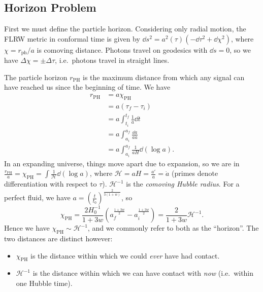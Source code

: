 \documentclass{jknotes}
\begin{document}
\subsection{Horizon Problem}
First we must define the particle horizon. Considering only radial motion, the FLRW metric in conformal time is given by \(\dd{s}^2 = a^2(\tau)(-\dd{\tau}^2+\dd{\chi}^2)\), where \(\chi = r_{\text{ph}}/a\) is comoving distance. Photons travel on geodesics with \(\dd{s}=0\), so we have \(\Delta\chi = \pm \Delta\tau\), i.e.\ photons travel in straight lines.
\begin{figure}[H]
    \centering
\end{figure}
The particle horizon \(r_{\text{PH}}\) is the maximum distance from which any signal can have reached us since the beginning of time. We have
\begin{align}
    r_{\text{PH}} &= a\chi_{\text{PH}} \\
                  &= a(\tau_f-\tau_i) \\
                  &= a\int^{t_f}_{t_i}\frac{1}{a}\dd{t} \\
                  &= a\int^{a_f}_{a_i}\frac{\dd{a}}{a\dot{a}} \\
                  &= a\int^{a_f}_{a_i}\frac{1}{aH}\dd{(\log a)}.
\end{align}
In an expanding universe, things move apart due to expansion, so we are in \(\frac{r_{\text{PH}}}{a} = \chi_{\text{PH}} = \int\frac{1}{\mathcal{H}}\dd{(\log a)}\), where \(\mathcal{H}=aH = \frac{a'}{a}=\dot{a}\) (primes denote differentiation with respect to \(\tau\)). \(\mathcal{H}^{-1}\) is the \emph{comoving Hubble radius}. For a perfect fluid, we have \(a=\left(\frac{t}{t_0}\right)^{\frac{2}{3(1+w)}}\), so
\begin{equation}
    \chi_{\text{PH}} = \frac{2H_0^{-1}}{1+3w} \left(a_f^{\frac{1+3w}{2}}-a_i^{\frac{1+3w}{2}}\right) = \frac{2}{1+3w}\mathcal{H}^{-1}.
\end{equation}
Hence we have \(\chi_{\text{PH}}\sim \mathcal{H}^{-1}\), and we commonly refer to both as the ``horizon''. The two distances are distinct however:
\begin{itemize}
    \item \(\chi_{\text{PH}}\) is the distance within which we could \emph{ever} have had contact.
    \item \(\mathcal{H}^{-1}\) is the distance within which we can have contact with \emph{now} (i.e.\ within one Hubble time).
\end{itemize}
\end{document}

